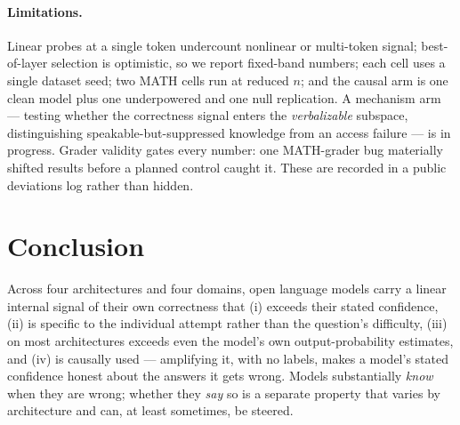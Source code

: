 \documentclass{article}
\begin{document}
\paragraph{Limitations.}
Linear probes at a single token undercount nonlinear or multi-token signal; best-of-layer selection is optimistic, so we report fixed-band numbers; each cell uses a single dataset seed; two MATH cells run at reduced $n$; and the causal arm is one clean model plus one underpowered and one null replication.
A mechanism arm --- testing whether the correctness signal enters the \emph{verbalizable} subspace, distinguishing speakable-but-suppressed knowledge from an access failure --- is in progress.
Grader validity gates every number: one MATH-grader bug materially shifted results before a planned control caught it.
These are recorded in a public deviations log rather than hidden.

\section{Conclusion}
\label{sec:conclusion}

Across four architectures and four domains, open language models carry a linear internal signal of their own correctness that (i) exceeds their stated confidence, (ii) is specific to the individual attempt rather than the question's difficulty, (iii) on most architectures exceeds even the model's own output-probability estimates, and (iv) is causally used --- amplifying it, with no labels, makes a model's stated confidence honest about the answers it gets wrong.
Models substantially \emph{know} when they are wrong; whether they \emph{say} so is a separate property that varies by architecture and can, at least sometimes, be steered.



\end{document}
